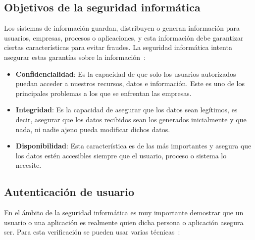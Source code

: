 \subsection{Objetivos de la seguridad informática}
Los sistemas de información guardan, distribuyen o generan información para usuarios, empresas, procesos o aplicaciones, y esta información debe garantizar ciertas características para evitar fraudes. La seguridad informática intenta asegurar estas garantías sobre la información~\cite{rediris_2002_introduction}:

\begin{itemize}
    \item \textbf{Confidencialidad}: Es la capacidad de que solo los usuarios autorizados puedan acceder a nuestros recursos, datos e información. Este es uno de los principales problemas a los que se enfrentan las empresas.
    \item \textbf{Integridad}: Es la capacidad de asegurar que los datos sean legítimos, es decir, asegurar que los datos recibidos sean los generados inicialmente y que nada, ni nadie ajeno pueda modificar dichos datos.
    \item \textbf{Disponibilidad}: Esta característica es de las más importantes y asegura que los datos estén accesibles siempre que el usuario, proceso o sistema lo necesite.


\end{itemize}


\subsection{Autenticación de usuario}
En el ámbito de la seguridad informática es muy importante demostrar que un usuario o una aplicación es realmente quien dicha persona o aplicación asegura ser. Para esta verificación se pueden usar varias técnicas~\cite{rediris_2002_auth}:

